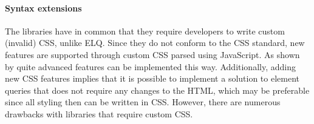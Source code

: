 \documentclass{acm_proc_article-sp}
\newcommand{\elq}{ELQ}
\newcommand{\gls}[1]{#1}
\begin{document}
  

  


  \paragraph{Syntax extensions}
  The libraries \cite{eq_imp_magichtml,eq_imp_eqcss,eq_imp_prollyfill-min-width,eq_imp_localised-css,eq_imp_gss} have in common that they require developers to write custom (invalid) \gls{CSS}, unlike \elq{}.
  Since they do not conform to the \gls{CSS} standard, new features are supported through custom \gls{CSS} parsed using JavaScript.
  As shown by \cite{eq_imp_eqcss,eq_imp_gss} quite advanced features can be implemented this way.
  Additionally, adding new \gls{CSS} features implies that it is possible to implement a solution to element queries that does not require any changes to the \gls{HTML}, which may be preferable since all styling then can be written in \gls{CSS}.
  However, there are numerous drawbacks with libraries that require custom \gls{CSS}.
\end{document}
